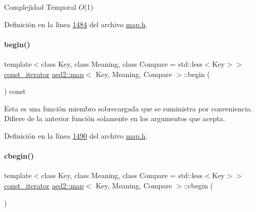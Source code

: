\begin{DoxyDescription}
\item[Complejidad Temporal]$O$(1)
\end{DoxyDescription}

Definición en la línea \hyperlink{map_8h_source_l01484}{1484} del archivo \hyperlink{map_8h_source}{map.\+h}.

\mbox{\label{classaed2_1_1map_af3b1818c2b44e37221cc3b131768555b_af3b1818c2b44e37221cc3b131768555b}} 
\paragraph{\texorpdfstring{begin()}{begin()}\hspace{0.1cm}{\footnotesize\ttfamily [2/2]}}
{\footnotesize\ttfamily template$<$class Key, class Meaning, class Compare = std\+::less$<$\+Key$>$$>$ \\
\hyperlink{classaed2_1_1map_1_1const__iterator}{const\+\_\+iterator} \hyperlink{classaed2_1_1map}{aed2\+::map}$<$ Key, Meaning, Compare $>$\+::begin (\begin{DoxyParamCaption}{ }\end{DoxyParamCaption}) const\hspace{0.3cm}{\ttfamily [inline]}}

Esta es una función miembro sobrecargada que se suministra por conveniencia. Difiere de la anterior función solamente en los argumentos que acepta. 

Definición en la línea \hyperlink{map_8h_source_l01490}{1490} del archivo \hyperlink{map_8h_source}{map.\+h}.

\mbox{\label{classaed2_1_1map_ab96ad892caa28f193481a578f4956a2a_ab96ad892caa28f193481a578f4956a2a}} 
\paragraph{\texorpdfstring{cbegin()}{cbegin()}}
{\footnotesize\ttfamily template$<$class Key, class Meaning, class Compare = std\+::less$<$\+Key$>$$>$ \\
\hyperlink{classaed2_1_1map_1_1const__iterator}{const\+\_\+iterator} \hyperlink{classaed2_1_1map}{aed2\+::map}$<$ Key, Meaning, Compare $>$\+::cbegin (\begin{DoxyParamCaption}{ }\end{DoxyParamCaption})\hspace{0.3cm}{\ttfamily [inline]}}

